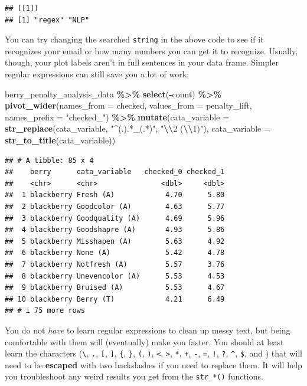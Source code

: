 \documentclass[
]{book}
\newenvironment{Shaded}{\begin{snugshade}}{\end{snugshade}}
\newcommand{\AttributeTok}[1]{\textcolor[rgb]{0.13,0.29,0.53}{#1}}
\newcommand{\FunctionTok}[1]{\textcolor[rgb]{0.13,0.29,0.53}{\textbf{#1}}}
\newcommand{\NormalTok}[1]{#1}
\newcommand{\SpecialCharTok}[1]{\textcolor[rgb]{0.81,0.36,0.00}{\textbf{#1}}}
\newcommand{\StringTok}[1]{\textcolor[rgb]{0.31,0.60,0.02}{#1}}
\begin{document}
\begin{verbatim}
## [[1]]
## [1] "regex" "NLP"
\end{verbatim}

You can try changing the searched \texttt{string} in the above code to see if it recognizes your email or how many numbers you can get it to recognize. Usually, though, your plot labels aren't in full sentences in your data frame. Simpler regular expressions can still save you a lot of work:

\begin{Shaded}
\begin{Highlighting}[]
\NormalTok{berry\_penalty\_analysis\_data }\SpecialCharTok{\%\textgreater{}\%}
  \FunctionTok{select}\NormalTok{(}\SpecialCharTok{{-}}\NormalTok{count) }\SpecialCharTok{\%\textgreater{}\%}
  \FunctionTok{pivot\_wider}\NormalTok{(}\AttributeTok{names\_from =}\NormalTok{ checked,}
              \AttributeTok{values\_from =}\NormalTok{ penalty\_lift,}
              \AttributeTok{names\_prefix =} \StringTok{"checked\_"}\NormalTok{) }\SpecialCharTok{\%\textgreater{}\%}
  \FunctionTok{mutate}\NormalTok{(}\AttributeTok{cata\_variable =} \FunctionTok{str\_replace}\NormalTok{(cata\_variable,}
                                     \StringTok{"\^{}(.).*\_(.*)"}\NormalTok{,}
                                     \StringTok{"}\SpecialCharTok{\textbackslash{}\textbackslash{}}\StringTok{2 (}\SpecialCharTok{\textbackslash{}\textbackslash{}}\StringTok{1)"}\NormalTok{),}
         \AttributeTok{cata\_variable =} \FunctionTok{str\_to\_title}\NormalTok{(cata\_variable))}
\end{Highlighting}
\end{Shaded}

\begin{verbatim}
## # A tibble: 85 x 4
##    berry      cata_variable   checked_0 checked_1
##    <chr>      <chr>               <dbl>     <dbl>
##  1 blackberry Fresh (A)            4.70      5.80
##  2 blackberry Goodcolor (A)        4.63      5.77
##  3 blackberry Goodquality (A)      4.69      5.96
##  4 blackberry Goodshapre (A)       4.93      5.86
##  5 blackberry Misshapen (A)        5.63      4.92
##  6 blackberry None (A)             5.42      4.78
##  7 blackberry Notfresh (A)         5.57      3.76
##  8 blackberry Unevencolor (A)      5.53      4.53
##  9 blackberry Bruised (A)          5.53      4.67
## 10 blackberry Berry (T)            4.21      6.49
## # i 75 more rows
\end{verbatim}

You do not \emph{have} to learn regular expressions to clean up messy text, but being comfortable with them will (eventually) make you faster. You should at least learn the characters (\texttt{\textbackslash{}}, \texttt{.}, \texttt{{[}}, \texttt{{]}}, \texttt{\{}, \texttt{\}}, \texttt{(}, \texttt{)}, \texttt{\textless{}}, \texttt{\textgreater{}}, \texttt{*}, \texttt{+}, \texttt{-}, \texttt{=}, \texttt{!}, \texttt{?}, \texttt{\^{}}, \texttt{\$}, and \texttt{\textbar{}}) that will need to be \textbf{escaped} with two backslashes if you need to replace them. It will help you troubleshoot any weird results you get from the \texttt{str\_*()} functions.
\end{document}
